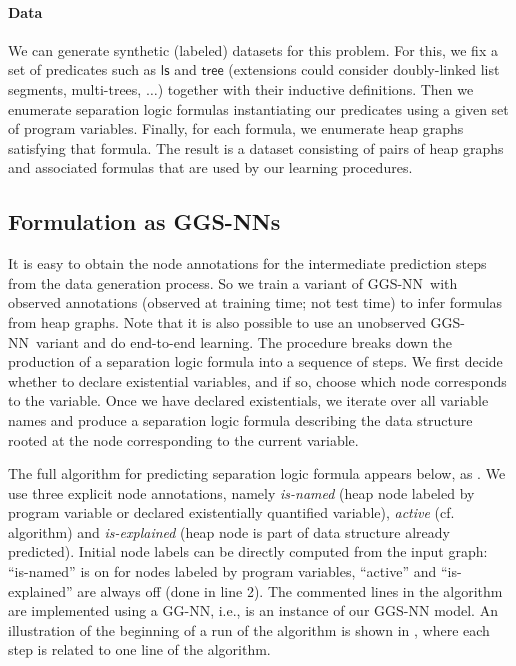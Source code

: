 \documentclass{article} %
\newcommand{\SLls}[0]{\ensuremath{\mathsf{ls}}}
\newcommand{\SLtree}[0]{\ensuremath{\mathsf{tree}}}
\newcommand{\OurMethodMinorShort}{GG-NN}
\newcommand{\OurMethodShort}{GGS-NN}
\newcommand{\OurMethodShorts}{\OurMethodShort s}
\begin{document}
\paragraph{Data}
We can generate synthetic (labeled) datasets for this problem.
For this, we fix a set of predicates such as $\SLls$ and $\SLtree$ (extensions
could consider doubly-linked list segments, multi-trees, $\ldots$) together with
their inductive definitions.
Then we enumerate separation logic
formulas instantiating our predicates using a given set of program variables.
Finally,
for each formula, we enumerate heap graphs satisfying that
formula. The result is a dataset consisting of pairs of heap graphs and
associated formulas that are used by our learning
procedures.


\subsection{Formulation as \OurMethodShorts}

It is easy to obtain
the node annotations for the intermediate prediction steps from the data
generation process. So we train a variant of
\OurMethodShort~with observed annotations (observed at training time; not test time)
to infer formulas from heap graphs.
Note that it is also possible to use an unobserved
\OurMethodShort~variant and do end-to-end learning. The procedure breaks down
the production of a separation logic formula into a sequence of
steps. We first decide whether to declare existential variables, and if so,
choose which node corresponds to the variable.
Once we have declared existentials, we iterate over all variable names
and produce a separation logic formula describing the data
structure rooted at the node corresponding to the current variable.

The full algorithm for predicting separation logic formula appears below, as
.
We use three explicit node annotations, namely \emph{is-named} (heap node labeled by
program variable or declared existentially quantified variable), \emph{active} (cf. algorithm) and \emph{is-explained} (heap node is
part of data structure already predicted).
Initial node labels can be directly computed from the input graph: ``is-named''
is on for nodes labeled by program variables, ``active'' and ``is-explained''
are always off (done in line 2).
The commented lines in the algorithm are implemented using a
\OurMethodMinorShort, i.e.,  is an instance of
our \OurMethodShort{} model.
An illustration of the beginning of a run of the algorithm is shown in
, where each step is related to one line of the
algorithm.
\end{document}
